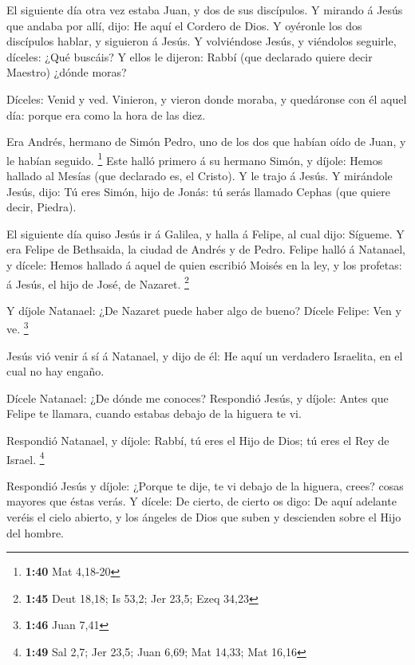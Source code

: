  El siguiente día otra vez estaba Juan, y dos de sus
discípulos.  Y mirando á Jesús que andaba por allí, dijo:
He aquí el Cordero de Dios.  Y oyéronle los dos
discípulos hablar, y siguieron á Jesús.  Y volviéndose
Jesús, y viéndolos seguirle, díceles: ¿Qué buscáis? Y ellos le dijeron:
Rabbí (que declarado quiere decir Maestro) ¿dónde moras?

 Díceles: Venid y ved. Vinieron, y vieron donde moraba, y
quedáronse con él aquel día: porque era como la hora de las diez.

 Era Andrés, hermano de Simón Pedro, uno de los dos que
habían oído de Juan, y le habían seguido. \footnote{\textbf{1:40} Mat
  4,18-20}  Este halló primero á su hermano Simón, y
díjole: Hemos hallado al Mesías (que declarado es, el Cristo).
 Y le trajo á Jesús. Y mirándole Jesús, dijo: Tú eres
Simón, hijo de Jonás: tú serás llamado Cephas (que quiere decir,
Piedra).

 El siguiente día quiso Jesús ir á Galilea, y halla á
Felipe, al cual dijo: Sígueme.  Y era Felipe de
Bethsaida, la ciudad de Andrés y de Pedro.  Felipe halló
á Natanael, y dícele: Hemos hallado á aquel de quien escribió Moisés en
la ley, y los profetas: á Jesús, el hijo de José, de Nazaret.
\footnote{\textbf{1:45} Deut 18,18; Is 53,2; Jer 23,5; Ezeq 34,23}

 Y díjole Natanael: ¿De Nazaret puede haber algo de
bueno? Dícele Felipe: Ven y ve. \footnote{\textbf{1:46} Juan 7,41}

 Jesús vió venir á sí á Natanael, y dijo de él: He aquí
un verdadero Israelita, en el cual no hay engaño.

 Dícele Natanael: ¿De dónde me conoces? Respondió Jesús,
y díjole: Antes que Felipe te llamara, cuando estabas debajo de la
higuera te vi.

 Respondió Natanael, y díjole: Rabbí, tú eres el Hijo de
Dios; tú eres el Rey de Israel. \footnote{\textbf{1:49} Sal 2,7; Jer
  23,5; Juan 6,69; Mat 14,33; Mat 16,16}

 Respondió Jesús y díjole: ¿Porque te dije, te vi debajo
de la higuera, crees? cosas mayores que éstas verás.  Y
dícele: De cierto, de cierto os digo: De aquí adelante veréis el cielo
abierto, y los ángeles de Dios que suben y descienden sobre el Hijo del
hombre.

